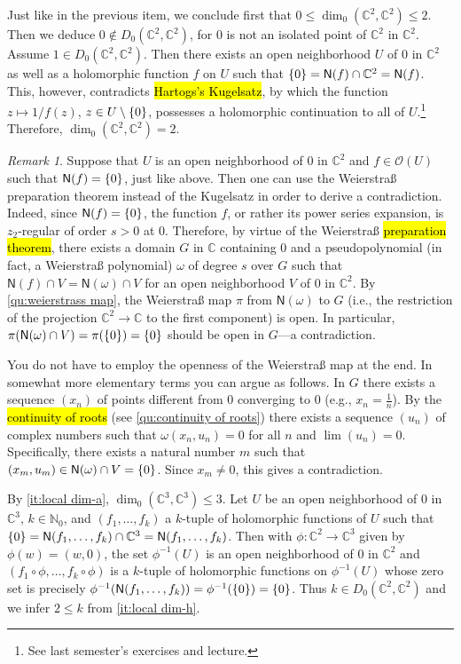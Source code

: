 \documentclass[a4paper]{amsart}
\newcommand{\N}{\mathbb{N}}
\newcommand{\C}{\mathbb{C}}
\newcommand{\Zero}[1]{\mathsf{N}(#1)}
\renewcommand{\O}{\mathcal{O}}
\theoremstyle{remark}
\newtheorem{remark}{Remark}[question]
\numberwithin{equation}{question}
\DeclarePairedDelimiter\set{\{}{\}}
\begin{document}
\begin{solution}
\begin{solenum}
\item Just like in the previous item, we conclude first that $0 \le \dim_0(\C^2,\C^2) \le 2$. Then we deduce $0 \notin D_0(\C^2,\C^2)$, for $0$ is not an isolated point of $\C^2$ in $\C^2$. Assume $1 \in D_0(\C^2,\C^2)$. Then there exists an open neighborhood $U$ of $0$ in $\C^2$ as well as a holomorphic function $f$ on $U$ such that $\set0 = \Zero f \cap \C^2 = \Zero f$. This, however, contradicts \hl{Hartogs's Kugelsatz}, by which the function $z \mapsto 1/f(z)$, $z \in U \setminus \set 0$, possesses a holomorphic continuation to all of $U$.\footnote{See last semester's exercises and lecture.} Therefore, $\dim_0(\C^2,\C^2) = 2$.

\begin{remark}
\label{re:local dim-1}
Suppose that $U$ is an open neighborhood of $0$ in $\C^2$ and $f \in \O(U)$ such that $\Zero f = \set 0$, just like above. Then one can use the Weierstraß preparation theorem instead of the Kugelsatz in order to derive a contradiction. Indeed, since $\Zero f = \set 0$, the function $f$, or rather its power series expansion, is $z_2$-regular of order $s>0$ at $0$. Therefore, by virtue of the Weierstraß \hl{preparation theorem}, there exists a domain $G$ in $\C$ containing $0$ and a pseudopolynomial (in fact, a Weierstraß polynomial) $\omega$ of degree $s$ over $G$ such that $\Zero f \cap V = \Zero\omega \cap V$ for an open neighborhood $V$ of $0$ in $\C^2$. By \cref{qu:weierstrass map}, the Weierstraß map $\pi$ from $\Zero\omega$ to $G$ (i.e., the restriction of the projection $\C^2 \to \C$ to the first component) is open. In particular, $\pi(\Zero\omega \cap V) = \pi(\set0) = \set0$ should be open in $G$---a contradiction.

You do not have to employ the openness of the Weierstraß map at the end. In somewhat more elementary terms you can argue as follows. In $G$ there exists a sequence $(x_n)$ of points different from $0$ converging to $0$ (e.g., $x_n = \frac1n$). By the \hl{continuity of roots} (see \cref{qu:continuity of roots}) there exists a sequence $(u_n)$ of complex numbers such that $\omega(x_n,u_n) = 0$ for all $n$ and $\lim(u_n) = 0$. Specifically, there exists a natural number $m$ such that $(x_m,u_m) \in \Zero\omega \cap V = \set 0$. Since $x_m \ne 0$, this gives a contradiction.
\end{remark}

\item By \cref{it:local dim-a}, $\dim_0(\C^3,\C^3) \le 3$. Let $U$ be an open neighborhood of $0$ in $\C^3$, $k \in \N_0$, and $(f_1,\dots,f_k)$ a $k$-tuple of holomorphic functions of $U$ such that $\set 0 = \Zero{f_1,\dots,f_k} \cap \C^3 = \Zero{f_1,\dots,f_k}$. Then with $\phi \colon \C^2 \to \C^3$ given by $\phi(w) = (w,0)$, the set $\phi^{-1}(U)$ is an open neighborhood of $0$ in $\C^2$ and $(f_1 \circ \phi,\dots,f_k\circ \phi)$ is a $k$-tuple of holomorphic functions on $\phi^{-1}(U)$ whose zero set is precisely $\phi^{-1}(\Zero{f_1,\dots,f_k}) = \phi^{-1}(\set 0) = \set 0$. Thus $k \in D_0(\C^2,\C^2)$ and we infer $2 \le k$ from \cref{it:local dim-h}.


\end{solenum}
\end{solution}
\end{document}
